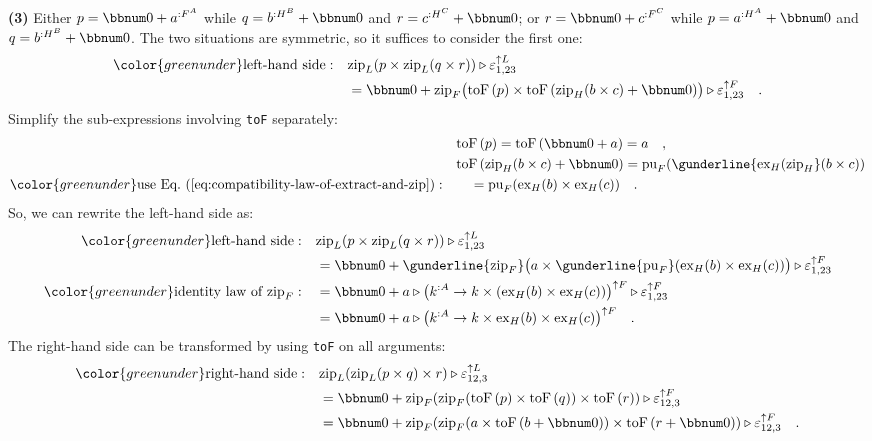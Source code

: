 \textbf{(3)} Either $p=\bbnum 0+a^{:F^{A}}$ while $q=b^{:H^{B}}+\bbnum 0$
and $r=c^{:H^{C}}+\bbnum 0$; or $r=\bbnum 0+c^{:F^{C}}$ while $p=a^{:H^{A}}+\bbnum 0$
and $q=b^{:H^{B}}+\bbnum 0$. The two situations are symmetric, so
it suffices to consider the first one:
\begin{align*}
{\color{greenunder}\text{left-hand side}:}\quad & \text{zip}_{L}(p\times\text{zip}_{L}(q\times r))\triangleright\varepsilon_{1,23}^{\uparrow L}\\
 & =\bbnum 0+\text{zip}_{F}\big(\text{toF}\,(p)\times\text{toF}\,(\text{zip}_{H}(b\times c)+\bbnum 0)\big)\triangleright\varepsilon_{1,23}^{\uparrow F}\quad.
\end{align*}
Simplify the sub-expressions involving \lstinline!toF! separately:
\begin{align*}
 & \text{toF}\,(p)=\text{toF}\,(\bbnum 0+a)=a\quad,\\
 & \text{toF}\,(\text{zip}_{H}(b\times c)+\bbnum 0)=\text{pu}_{F}(\gunderline{\text{ex}_{H}(\text{zip}_{H}}(b\times c))\\
{\color{greenunder}\text{use Eq.~(\ref{eq:compatibility-law-of-extract-and-zip})}:}\quad & \quad=\text{pu}_{F}(\text{ex}_{H}(b)\times\text{ex}_{H}(c))\quad.
\end{align*}
So, we can rewrite the left-hand side as:
\begin{align*}
{\color{greenunder}\text{left-hand side}:}\quad & \text{zip}_{L}(p\times\text{zip}_{L}(q\times r))\triangleright\varepsilon_{1,23}^{\uparrow L}\\
 & =\bbnum 0+\gunderline{\text{zip}_{F}}\big(a\times\gunderline{\text{pu}_{F}}(\text{ex}_{H}(b)\times\text{ex}_{H}(c))\big)\triangleright\varepsilon_{1,23}^{\uparrow F}\\
{\color{greenunder}\text{identity law of }\text{zip}_{F}:}\quad & =\bbnum 0+a\triangleright\big(k^{:A}\rightarrow k\times(\text{ex}_{H}(b)\times\text{ex}_{H}(c))\big)^{\uparrow F}\triangleright\varepsilon_{1,23}^{\uparrow F}\\
 & =\bbnum 0+a\triangleright\big(k^{:A}\rightarrow k\times\text{ex}_{H}(b)\times\text{ex}_{H}(c)\big)^{\uparrow F}\quad.
\end{align*}
The right-hand side can be transformed by using \lstinline!toF! on
all arguments:
\begin{align*}
{\color{greenunder}\text{right-hand side}:}\quad & \text{zip}_{L}(\text{zip}_{L}(p\times q)\times r)\triangleright\varepsilon_{12,3}^{\uparrow L}\\
 & =\bbnum 0+\text{zip}_{F}(\text{zip}_{F}(\text{toF}\left(p\right)\times\text{toF}\left(q\right))\times\text{toF}\left(r\right))\triangleright\varepsilon_{12,3}^{\uparrow F}\\
 & =\bbnum 0+\text{zip}_{F}(\text{zip}_{F}(a\times\text{toF}\left(b+\bbnum 0\right))\times\text{toF}\left(r+\bbnum 0\right))\triangleright\varepsilon_{12,3}^{\uparrow F}\quad.
\end{align*}
